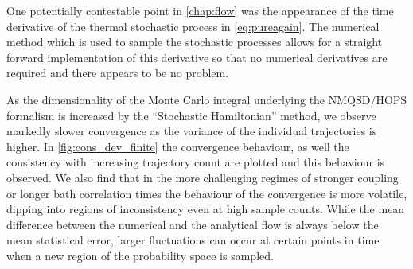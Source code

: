 One potentially contestable point in \cref{chap:flow} was the
appearance of the time derivative of the thermal stochastic process in
\cref{eq:pureagain}. The numerical method which is used to sample the
stochastic processes allows for a straight forward implementation of
this derivative so that no numerical derivatives are required and
there appears to be no problem.

As the dimensionality of the Monte Carlo integral underlying the
NMQSD/HOPS formalism is increased by the ``Stochastic Hamiltonian''
method, we observe markedly slower convergence as the variance of the
individual trajectories is higher. In \cref{fig:cons_dev_finite} the
convergence behaviour, as well the consistency with increasing
trajectory count are plotted and this behaviour is observed. We also
find that in the more challenging regimes of stronger coupling or
longer bath correlation times the behaviour of the convergence is more
volatile, dipping into regions of inconsistency even at high sample
counts. While the mean difference between the numerical and the
analytical flow is always below the mean statistical error, larger
fluctuations can occur at certain points in time when a new region of
the probability space is sampled.

